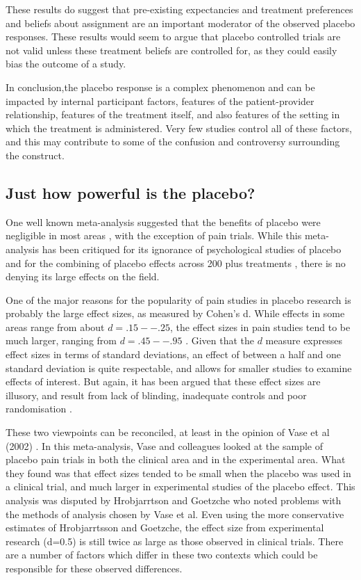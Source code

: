These results do suggest that pre-existing expectancies and treatment preferences and beliefs about assignment are an important moderator of the observed placebo responses. These results would seem to argue that placebo controlled trials are not valid unless these treatment beliefs are controlled for, as they could easily bias the outcome of a study. 


In conclusion,the placebo response is a complex phenomenon and can be impacted by internal  participant factors, features of the patient-provider relationship, features of the treatment itself, and also features of the setting in which the treatment is administered. Very few studies control all of these factors, and this may contribute to some of the confusion and controversy surrounding the construct. 

\subsection{Just how powerful is the placebo?}

One well known meta-analysis suggested that the benefits of placebo were negligible in most areas \cite{HrAbjartsson2001}, with the exception of pain trials. While this meta-analysis has been critiqued for its ignorance of psychological studies of placebo \cite{Evans2003, Stewart-Williams2004b}  and for the combining of placebo effects across 200 plus treatments \cite{Wickramasekera2001}, there is no denying its large effects on the field. 

One of the major reasons for the popularity of pain studies in placebo research is probably the large effect sizes, as measured by Cohen's d. While effects in some areas range from about $d=.15--.25$, the effect sizes in pain studies tend to be much larger, ranging from $d=.45--.95$ \cite{Vase2002}. Given that the $d$ measure  expresses effect sizes in terms of standard deviations, an effect of between a half and one standard deviation is quite respectable, and allows for smaller studies to examine effects of interest.  But again, it has been argued that these effect sizes are illusory, and result from lack of blinding, inadequate controls and poor randomisation \cite{Hrobjartsson2003,Kienle1997} . 

These two viewpoints can be reconciled, at least in the opinion of Vase et al  (2002) \cite{Vase2002}. In this meta-analysis, Vase and colleagues looked at the sample of placebo pain trials in both the clinical area and in the experimental area. What they found was that effect sizes tended to be small when the placebo was used in a clinical trial, and much larger in experimental studies of the placebo effect. This analysis was disputed by Hrobjarrtson and Goetzche \cite{Hrobjartsson2003} who noted problems with the methods of analysis chosen by Vase et al. Even using the more conservative estimates of Hrobjarrtsson and Goetzche, the effect size from experimental research (d=0.5) is still twice as large as those observed in clinical trials. There are a number of factors which differ in these two contexts which could be responsible for these observed differences. 

